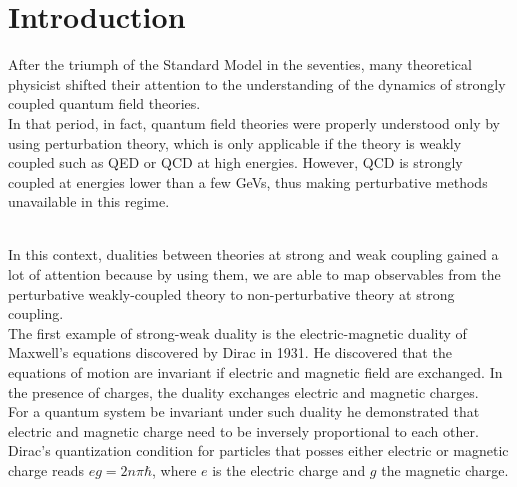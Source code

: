 

\chapter{Introduction}

After the triumph of the Standard Model in the seventies, many theoretical physicist shifted their attention to the understanding of the dynamics of strongly coupled quantum field theories. \\
In that period, in fact, quantum field theories were properly understood only by using perturbation theory, which is only applicable if the theory is weakly coupled such as QED or QCD at high energies.
However, QCD is strongly coupled at energies lower than a few GeVs, thus making perturbative methods unavailable in this regime.
\begin{comment}
Perturbative methods rely on the fact that the theory in question is weakly coupled, i.e. its coupling constant is much lower than one. This was not a problem for QED since its coupling constant $\alpha \sim 1/137$ is much lower than one at low energies and grows slowly while increasing the energy scale.
As a result, QED calculations have a high precision and non-perturbative methods were not needed.\\
In 1973 was discovered that quantum chromodynamics with three flavours is asymptotically free, i.e. its coupling constant becomes smaller at higher energies. 
As a result, collider physics can be understood in terms of Feynman diagrams but at low-energies the theory is strongly coupled and perturbation theory cannot be used to understand the dynamics of the theory.
Computer simulations on a lattice are the most reliable tool to investigate QCD at low-energies, but they cannot provide a complete understanding of the behavior of QCD.\\ 
\end{comment}\
\\
In this context, dualities between theories at strong and weak coupling gained a lot of attention because by using them, we are able to map observables from the perturbative weakly-coupled theory to non-perturbative theory at strong coupling.
\\

The first example of strong-weak duality is the electric-magnetic duality of Maxwell's equations discovered by Dirac in 1931.  
He discovered that the equations of motion are invariant if electric and magnetic field are exchanged. 
In the presence of charges, the duality exchanges electric and magnetic charges. \\
For a quantum system be invariant under such duality he demonstrated that electric and magnetic charge need to be inversely proportional to each other. 
Dirac's quantization condition for particles that posses either electric or magnetic charge reads $e g =  2 n \pi \hbar$, where $e$ is the electric charge and $g$ the magnetic charge.
\\

